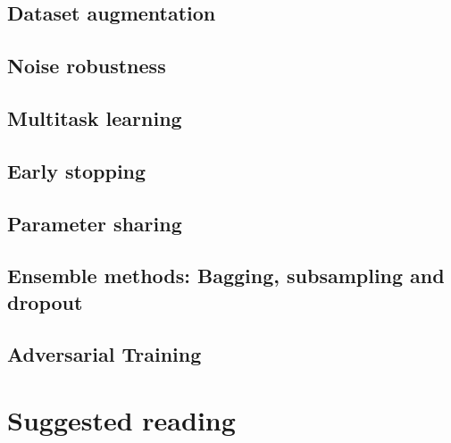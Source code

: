 \subsection{Dataset augmentation}
\subsection{Noise robustness}
\subsection{Multitask learning}
\subsection{Early stopping}
\subsection{Parameter sharing}
\subsection{Ensemble methods: Bagging, subsampling and dropout}
\subsection{Adversarial Training}


\section{Suggested reading}

